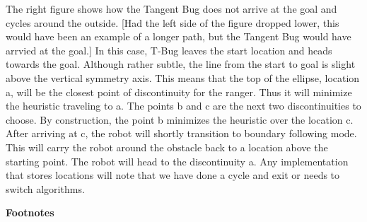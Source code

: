 The right figure shows how the Tangent Bug does not arrive at the goal
and cycles around the outside. {[}Had the left side of the figure
dropped lower, this would have been an example of a longer path, but the
Tangent Bug would have arrvied at the goal.{]} In this case, T-Bug
leaves the start location and heads towards the goal. Although rather
subtle, the line from the start to goal is slight above the vertical
symmetry axis. This means that the top of the ellipse, location a, will
be the closest point of discontinuity for the ranger. Thus it will
minimize the heuristic traveling to a. The points b and c are the next
two discontinuities to choose. By construction, the point b minimizes
the heuristic over the location c. After arriving at c, the robot will
shortly transition to boundary following mode. This will carry the robot
around the obstacle back to a location above the starting point. The
robot will head to the discontinuity a. Any implementation that stores
locations will note that we have done a cycle and exit or needs to
switch algorithms.

\textbf{Footnotes}
